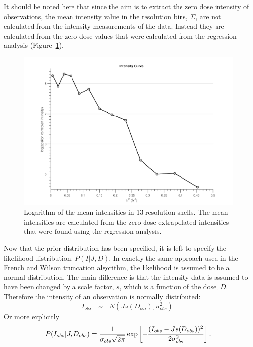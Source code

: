 It should be noted here that since the aim is to extract the zero dose intensity of observations, the mean intensity value in the resolution bins, $\Sigma$, are not calculated from the intensity measurements of the data.
Instead they are calculated from the zero dose values that were calculated from the regression analysis (Figure~\ref{fig:Zero-dose mean intensity in resolution shells - Extrapolation method}).
\begin{figure}
  \centering
    \includegraphics[width=1\textwidth]{figures/zde/extrapolationscaling.pdf}
    \caption{Logarithm of the mean intensities in 13 resolution shells.
    The mean intensities are calculated from the zero-dose extrapolated intensities that were found using the regression analysis.}
    \label{fig:Zero-dose mean intensity in resolution shells - Extrapolation method}
\end{figure}

Now that the prior distribution has been specified, it is left to specify the likelihood distribution, $P(I | J, D)$.
In exactly the same approach used in the French and Wilson truncation algorithm, the likelihood is assumed to be a normal distribution.
The main difference is that the intensity data is assumed to have been changed by a scale factor, $s$, which is a function of the dose, $D$.
Therefore the intensity of an observation is normally distributed:
\begin{equation}
    I_{obs} \quad \text{\textasciitilde} \quad N(Js(D_{obs}),\sigma_{obs}^2).
    \label{eq:Normally distributed intensity - Extrapolation method}
\end{equation}
Or more explicitly
\begin{equation}
    P(I_{obs} | J, D_{obs}) = \frac{1}{\sigma_{obs} \sqrt{2\pi}} \exp \left[-\frac{(I_{obs} - J s(D_{obs}))^2}{2 \sigma^2_{obs}} \right].
    \label{eq:Normally distributed intensity full equation - Extrapolation method}
\end{equation}

